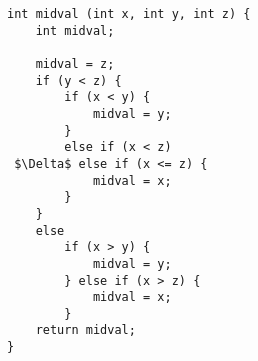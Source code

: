 
\begin{lstlisting}[style=CStyle, caption=midval function returns the mid value between three integers., label=midval, mathescape=true]
int midval (int x, int y, int z) {
	int midval;

	midval = z;
	if (y < z) {
		if (x < y) {
			midval = y;
		}
		else if (x < z) 
 $\Delta$ else if (x <= z) {
			midval = x;	
		}
	}
	else 
		if (x > y) {
			midval = y;
		} else if (x > z) {
			midval = x;
		}
	return midval;
}
\end{lstlisting}